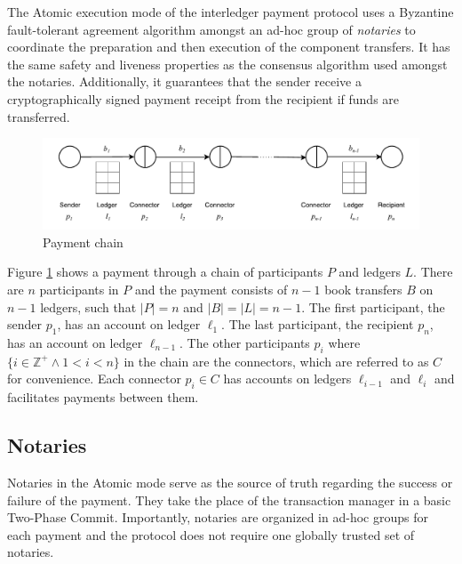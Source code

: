 \documentclass[letterpaper,twocolumn,10pt]{article}
\begin{document}
The Atomic execution mode of the interledger payment protocol uses a Byzantine fault-tolerant agreement algorithm amongst an ad-hoc group of \textit{notaries} to coordinate the preparation and then execution of the component transfers. It has the same safety and liveness properties as the consensus algorithm used amongst the notaries. Additionally, it guarantees that the sender receive a cryptographically signed payment receipt from the recipient if funds are transferred.

\begin{figure}[th!]
    \centering
    \includegraphics[width=\textwidth]{figures/payment-chain.pdf}
    \caption{Payment chain}
    \label{fig:n-bells}
\end{figure}

Figure \ref{fig:n-bells} shows a payment through a chain of participants $P$ and ledgers $L$. There are $n$ participants in $P$ and the payment consists of $n-1$ book transfers $B$ on $n-1$ ledgers, such that $ \left\vert{P}\right\vert = n $ and $\left\vert{B}\right\vert = \left\vert{L}\right\vert = n-1 $. The first participant, the sender $p_1$, has an account on ledger $\ell_1$. The last participant, the recipient $p_n$, has an account on ledger $\ell_{n-1}$. The other participants $p_i$ where $ \{ i \in \mathbb{Z}^+ \land 1 < i < n \} $ in the chain are the connectors, which are referred to as $C$ for convenience. Each connector $p_i \in C$ has accounts on ledgers $\ell_{i-1}$ and $\ell_i$ and facilitates payments between them.


\subsection{Notaries}


Notaries in the Atomic mode serve as the source of truth regarding the success or failure of the payment. They take the place of the transaction manager in a basic Two-Phase Commit. Importantly, notaries are organized in ad-hoc groups for each payment and the protocol does not require one globally trusted set of notaries.
\end{document}

